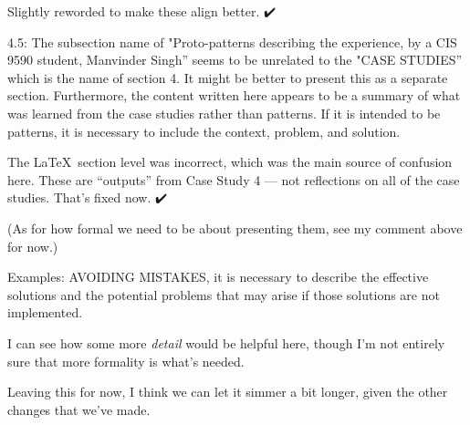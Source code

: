 \documentclass[acmlarge,timestamp]{acmart}
\begin{document}
\begin{rightbubbles}
Slightly reworded to make these align better. {\huge ✔️}
\end{rightbubbles}

\begin{leftbubbles}
4.5: The subsection name of "Proto-patterns describing the experience,
by a CIS 9590 student, Manvinder Singh” seems to be unrelated to the
"CASE STUDIES” which is the name of section 4. It might be better to
present this as a separate section. Furthermore, the content written
here appears to be a summary of what was learned from the case studies
rather than patterns. If it is intended to be patterns, it is
necessary to include the context, problem, and solution.
\end{leftbubbles}

\begin{rightbubbles}
The \LaTeX\ section level was incorrect, which was the main source of
confusion here.  These are “outputs” from Case Study 4 — not
reflections on all of the case studies.  That’s fixed now.  {\huge ✔️}

(As for how formal we need to be about presenting them, see my comment
above for now.)
\end{rightbubbles}

\begin{leftbubbles}
Examples: AVOIDING MISTAKES, it is necessary to describe the effective
solutions and the potential problems that may arise if those solutions
are not implemented.
\end{leftbubbles}

\begin{rightbubbles}
I can see how some more \emph{detail} would be helpful here, though
I’m not entirely sure that more formality is what’s needed.  {\huge
  🤔}

Leaving this for now, I think we can let it simmer a bit longer, given
the other changes that we’ve made.
\end{rightbubbles}
\end{document}
